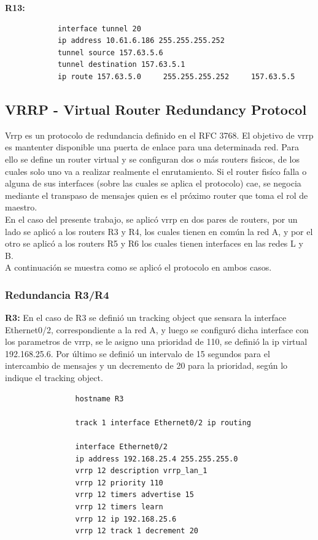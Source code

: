 		\vspace{0.5cm}
		\textbf{R13:}
		\begin{verbatim}
			interface tunnel 20
			ip address 10.61.6.186 255.255.255.252
			tunnel source 157.63.5.6
			tunnel destination 157.63.5.1
			ip route 157.63.5.0 	255.255.255.252 	157.63.5.5
		\end{verbatim}	

	\vspace{0.5cm}	
	\subsection{VRRP - Virtual Router Redundancy Protocol}
		Vrrp es un protocolo de redundancia definido en el RFC 3768. El objetivo de vrrp es
		mantenter disponible una puerta de enlace para una determinada red. Para ello se
		define un router virtual y se configuran dos o más routers fisicos, de los cuales 
		solo uno va a realizar realmente el enrutamiento. Si el router fisíco falla o 
		alguna de sus interfaces (sobre las cuales se aplica el protocolo) cae, se negocia
		mediante el transpaso de mensajes quien es el próximo router que toma el rol de 
		maestro.\\
		En el caso del presente trabajo, se aplicó vrrp en dos pares de routers, por un 
		lado se aplicó a los routers R3 y R4, los cuales tienen en común la red A, y por
		el otro se aplicó a los routers R5 y R6 los cuales tienen interfaces en las redes 
		L y B.\\
		A continuación se muestra como se aplicó el protocolo en ambos casos.
		
		\subsubsection{Redundancia R3/R4}
			\textbf{R3:}
			En el caso de R3 se definió un tracking object que sensara la interface
			Ethernet0/2, correspondiente a la red A, y luego se configuró 
			dicha interface con los parametros de vrrp, se le asigno una prioridad de
			110, se definió la ip virtual 192.168.25.6. Por último se definió un 
			intervalo de 15 segundos para el intercambio de mensajes y un decremento 
			de 20 para la prioridad, según lo indique el tracking object.
			\begin{verbatim}
				hostname R3

				track 1 interface Ethernet0/2 ip routing

				interface Ethernet0/2
				ip address 192.168.25.4 255.255.255.0
				vrrp 12 description vrrp_lan_1
				vrrp 12 priority 110
				vrrp 12 timers advertise 15
				vrrp 12 timers learn
				vrrp 12 ip 192.168.25.6
				vrrp 12 track 1 decrement 20
			\end{verbatim}

